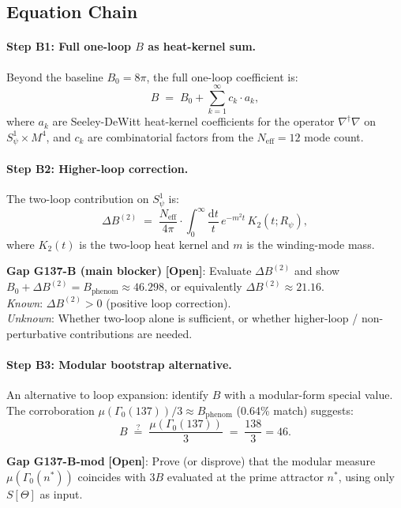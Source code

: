\documentclass[12pt,a4paper]{article}
\theoremstyle{definition}
\theoremstyle{remark}
\newcommand{\OPEN}{\textbf{[Open]}}
\begin{document}
\subsection{Equation Chain}

\paragraph{Step B1: Full one-loop $B$ as heat-kernel sum.}
Beyond the baseline $B_0 = 8\pi$, the full one-loop coefficient is:
\[
  B \;=\; B_0 + \sum_{k=1}^{\infty} c_k \cdot a_k,
\]
where $a_k$ are Seeley-DeWitt heat-kernel coefficients for the operator
$\nabla^\dagger\nabla$ on $S^1_\psi \times M^4$, and $c_k$ are
combinatorial factors from the $N_{\mathrm{eff}} = 12$ mode count.

\paragraph{Step B2: Higher-loop correction.}
The two-loop contribution on $S^1_\psi$ is:
\[
  \Delta B^{(2)}
  \;=\;
  \frac{N_{\mathrm{eff}}}{4\pi}\cdot
  \int_0^\infty \frac{\mathrm{d}t}{t}\,e^{-m^2 t}\,K_2(t;R_\psi),
\]
where $K_2(t)$ is the two-loop heat kernel and $m$ is the winding-mode mass.
\begin{mdframed}[backgroundcolor=yellow!15]
\textbf{Gap G137-B (main blocker)} \OPEN: Evaluate $\Delta B^{(2)}$ and
show $B_0 + \Delta B^{(2)} = B_{\mathrm{phenom}} \approx 46.298$, or
equivalently $\Delta B^{(2)} \approx 21.16$.\\
\textit{Known}: $\Delta B^{(2)} > 0$ (positive loop correction).\\
\textit{Unknown}: Whether two-loop alone is sufficient, or whether
higher-loop / non-perturbative contributions are needed.
\end{mdframed}

\paragraph{Step B3: Modular bootstrap alternative.}
An alternative to loop expansion: identify $B$ with a modular-form special value.
The corroboration $\mu(\Gamma_0(137))/3 \approx B_{\mathrm{phenom}}$
(0.64\% match) suggests:
\[
  B \;\stackrel{?}{=}\; \frac{\mu(\Gamma_0(137))}{3}
    \;=\; \frac{138}{3} = 46.
\]
\begin{mdframed}[backgroundcolor=yellow!15]
\textbf{Gap G137-B-mod} \OPEN: Prove (or disprove) that the modular
measure $\mu(\Gamma_0(n^*))$ coincides with $3B$ evaluated at the prime
attractor $n^*$, using only $S[\Theta]$ as input.
\end{mdframed}
\end{document}
